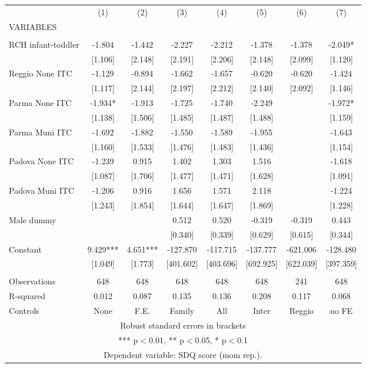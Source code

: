 \begin{tabular}{lccccccc} \hline
 & (1) & (2) & (3) & (4) & (5) & (6) & (7) \\
VARIABLES &  &  &  &  &  &  &  \\ \hline
 &  &  &  &  &  &  &  \\
RCH infant-toddler & -1.804 & -1.442 & -2.227 & -2.212 & -1.378 & -1.378 & -2.049* \\
 & [1.106] & [2.148] & [2.191] & [2.206] & [2.148] & [2.099] & [1.120] \\
Reggio None ITC & -1.129 & -0.894 & -1.662 & -1.657 & -0.620 & -0.620 & -1.424 \\
 & [1.117] & [2.144] & [2.197] & [2.212] & [2.140] & [2.092] & [1.146] \\
Parma None ITC & -1.934* & -1.913 & -1.725 & -1.740 & -2.249 &  & -1.972* \\
 & [1.138] & [1.506] & [1.485] & [1.487] & [1.488] &  & [1.159] \\
Parma Muni ITC & -1.692 & -1.882 & -1.550 & -1.589 & -1.955 &  & -1.643 \\
 & [1.160] & [1.533] & [1.476] & [1.483] & [1.436] &  & [1.154] \\
Padova None ITC & -1.239 & 0.915 & 1.402 & 1.303 & 1.516 &  & -1.618 \\
 & [1.087] & [1.706] & [1.477] & [1.471] & [1.628] &  & [1.091] \\
Padova Muni ITC & -1.206 & 0.916 & 1.656 & 1.571 & 2.118 &  & -1.224 \\
 & [1.243] & [1.854] & [1.644] & [1.647] & [1.869] &  & [1.228] \\
Male dummy &  &  & 0.512 & 0.520 & -0.319 & -0.319 & 0.443 \\
 &  &  & [0.340] & [0.339] & [0.629] & [0.615] & [0.344] \\
Constant & 9.429*** & 4.651*** & -127.870 & -117.715 & -137.777 & -621.006 & -128.480 \\
 & [1.049] & [1.773] & [401.602] & [403.696] & [692.925] & [622.039] & [397.359] \\
 &  &  &  &  &  &  &  \\
Observations & 648 & 648 & 648 & 648 & 648 & 241 & 648 \\
R-squared & 0.012 & 0.087 & 0.135 & 0.136 & 0.208 & 0.117 & 0.068 \\
 Controls & None & F.E. & Family & All & Inter & Reggio & no FE \\ \hline
\multicolumn{8}{c}{ Robust standard errors in brackets} \\
\multicolumn{8}{c}{ *** p$<$0.01, ** p$<$0.05, * p$<$0.1} \\
\multicolumn{8}{c}{ Dependent variable: SDQ score (mom rep.).} \\
\end{tabular}
